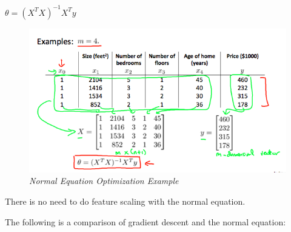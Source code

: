\documentclass[
]{article}
\begin{document}
\(\theta = (X^T X)^{-1}X^T y\)

\begin{figure}
\centering
\includegraphics{Normal Equation graph 1.png}
\caption{\emph{Normal Equation Optimization Example}}
\end{figure}

There is no need to do feature scaling with the normal equation.

The following is a comparison of gradient descent and the normal
equation:
\end{document}
